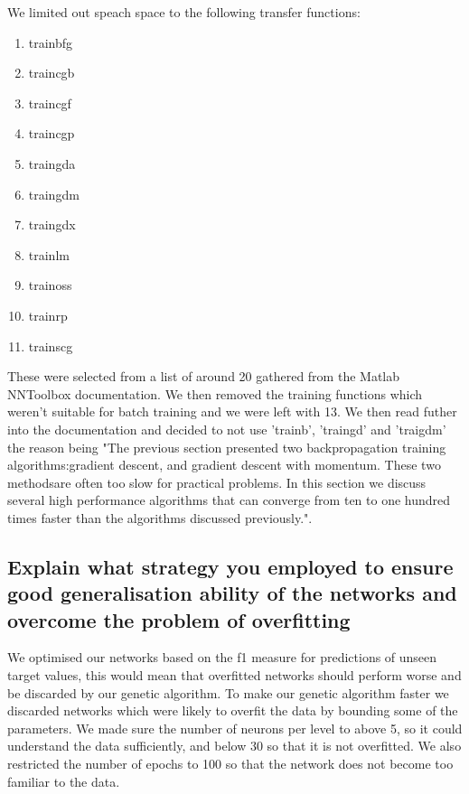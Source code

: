 \documentclass[11pt]{article}
\begin{document}
We limited out speach space to the following transfer functions:
\begin{multicols}{2}
\begin{enumerate}
  \item trainbfg
  \item traincgb
  \item traincgf
  \item traincgp
  \item traingda
  \item traingdm
  \item traingdx
  \item trainlm
  \item trainoss
  \item trainrp
  \item trainscg 
\end{enumerate}
\end{multicols}

These were selected from a list of around 20 gathered from the Matlab NNToolbox documentation. We then removed the training functions which weren't suitable for batch training and we were left with 13. We then read futher into the documentation and decided to not use 'trainb', 'traingd' and 'traigdm' the reason being "The previous section presented two backpropagation training algorithms:gradient descent, and gradient descent with momentum. These two methodsare often too slow for practical problems. In this section we discuss several high performance algorithms that can converge from ten to one hundred times faster than the algorithms discussed previously.".


\subsection{Explain what strategy you employed to ensure good generalisation ability of the networks and overcome the problem of overfitting}

We optimised our networks based on the f1 measure for predictions of unseen target values, this would mean that overfitted networks should perform worse and be discarded by our genetic algorithm. To make our genetic algorithm faster we discarded networks which were likely to overfit the data by bounding some of the parameters. We made sure the number of neurons per level to above 5, so it could understand the data sufficiently, and below 30 so that it is not overfitted. We also restricted the number of epochs to 100 so that the network does not become too familiar to the data. 
\end{document}
